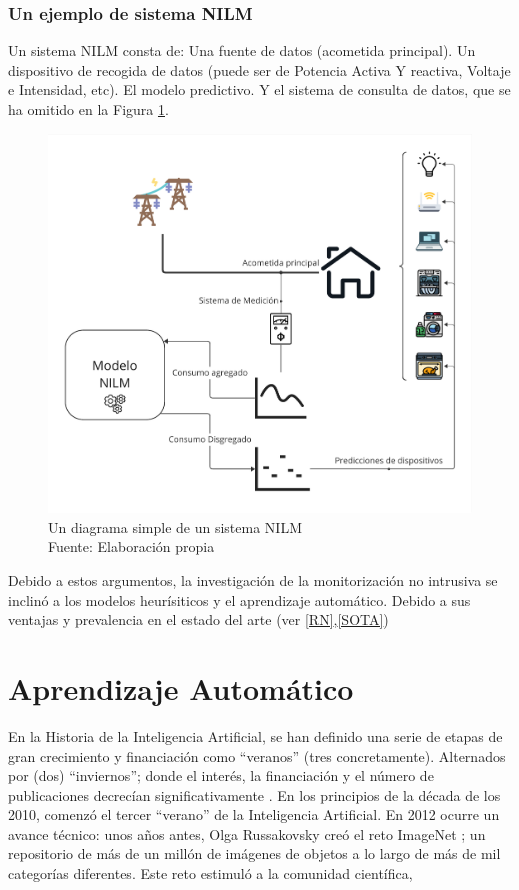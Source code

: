 \subsubsection{Un ejemplo de sistema NILM}
Un sistema NILM consta de: Una fuente de datos (acometida principal). Un dispositivo de recogida de datos (puede ser de Potencia Activa Y reactiva, Voltaje e Intensidad, etc). El modelo predictivo. Y el sistema de consulta de datos, que se ha omitido en la Figura \ref{diagramaNILM}.
\begin{figure}
    \centering
    \includegraphics[width=450px]{images/SistemaNILM.pdf}
    \caption{Un diagrama simple de un sistema NILM \\ Fuente: Elaboración propia}
    \label{diagramaNILM}
\end{figure}

Debido a estos argumentos, la investigación de la monitorización no intrusiva se inclinó a los modelos heurísiticos y el aprendizaje automático. Debido a sus ventajas y prevalencia en el estado del arte (ver \ref{RN},\ref{SOTA})


\section{Aprendizaje Automático}

En la Historia de la Inteligencia Artificial, se han definido una serie de etapas de gran crecimiento y financiación como  \foreignquote{spanish}{veranos} (tres concretamente). Alternados por (dos) \foreignquote{spanish}{inviernos}; donde el interés, la financiación y el número de publicaciones decrecían significativamente \autocite{briefAIHistory}.
En los principios de la década de los 2010, comenzó el tercer \enquote{verano} de la Inteligencia Artificial. En 2012 ocurre un avance técnico: unos años antes, Olga Russakovsky creó el reto ImageNet \autocite{ImageNetRussakovsky}; un repositorio de más de un millón de imágenes de objetos a lo largo de más de mil categorías diferentes. 
Este reto estimuló a la comunidad científica, 

